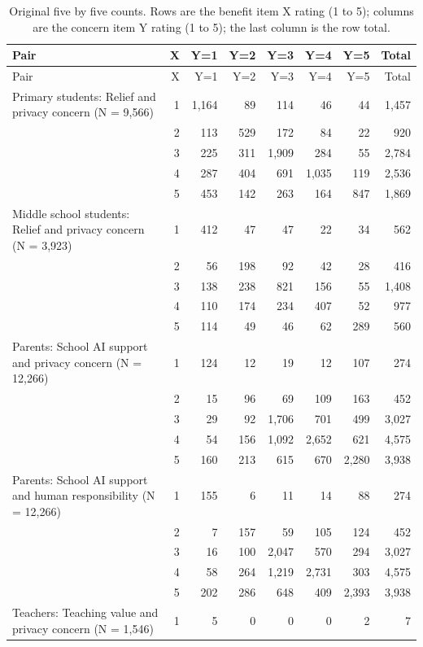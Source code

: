 \begin{longtable}{@{}p{}rrrrrrr@{}}
\caption{Original five by five counts. Rows are the benefit item X rating (1 to 5); columns are the concern item Y rating (1 to 5); the last column is the row total.}\label{tab:joint_5x5}\\
\toprule Pair & X & Y=1 & Y=2 & Y=3 & Y=4 & Y=5 & Total \\ \midrule \endfirsthead
\toprule Pair & X & Y=1 & Y=2 & Y=3 & Y=4 & Y=5 & Total \\ \midrule \endhead
\bottomrule \endfoot
Primary students: Relief and privacy concern (N = 9{,}566) & 1 & 1{,}164 & 89 & 114 & 46 & 44 & 1{,}457 \\
 & 2 & 113 & 529 & 172 & 84 & 22 & 920 \\
 & 3 & 225 & 311 & 1{,}909 & 284 & 55 & 2{,}784 \\
 & 4 & 287 & 404 & 691 & 1{,}035 & 119 & 2{,}536 \\
 & 5 & 453 & 142 & 263 & 164 & 847 & 1{,}869 \\
\midrule
Middle school students: Relief and privacy concern (N = 3{,}923) & 1 & 412 & 47 & 47 & 22 & 34 & 562 \\
 & 2 & 56 & 198 & 92 & 42 & 28 & 416 \\
 & 3 & 138 & 238 & 821 & 156 & 55 & 1{,}408 \\
 & 4 & 110 & 174 & 234 & 407 & 52 & 977 \\
 & 5 & 114 & 49 & 46 & 62 & 289 & 560 \\
\midrule
Parents: School AI support and privacy concern (N = 12{,}266) & 1 & 124 & 12 & 19 & 12 & 107 & 274 \\
 & 2 & 15 & 96 & 69 & 109 & 163 & 452 \\
 & 3 & 29 & 92 & 1{,}706 & 701 & 499 & 3{,}027 \\
 & 4 & 54 & 156 & 1{,}092 & 2{,}652 & 621 & 4{,}575 \\
 & 5 & 160 & 213 & 615 & 670 & 2{,}280 & 3{,}938 \\
\midrule
Parents: School AI support and human responsibility (N = 12{,}266) & 1 & 155 & 6 & 11 & 14 & 88 & 274 \\
 & 2 & 7 & 157 & 59 & 105 & 124 & 452 \\
 & 3 & 16 & 100 & 2{,}047 & 570 & 294 & 3{,}027 \\
 & 4 & 58 & 264 & 1{,}219 & 2{,}731 & 303 & 4{,}575 \\
 & 5 & 202 & 286 & 648 & 409 & 2{,}393 & 3{,}938 \\
\midrule
Teachers: Teaching value and privacy concern (N = 1{,}546) & 1 & 5 & 0 & 0 & 0 & 2 & 7 \\

\end{longtable}
